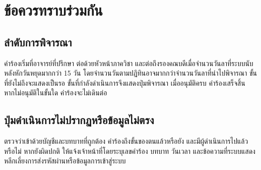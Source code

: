 \documentclass[17pt,a4paper]{extreport}
\begin{document}
\chapter{ข้อควรทราบร่วมกัน}
\section{ลำดับการพิจารณา}
คำร้องเริ่มที่อาจารย์ที่ปรึกษา ต่อด้วยหัวหน้าภาควิชา และต่อถึงรองคณบดีเมื่อจำนวนวันลาที่ระบบนับหลังหักวันหยุดมากกว่า 15 วัน โดยจำนวนวันตามปฏิทินอาจมากกว่าจำนวนวันลาที่นำไปพิจารณา ขั้นที่ยังไม่ถึงจะแสดงเป็นรอ ขั้นที่กำลังดำเนินการจึงแสดงปุ่มพิจารณา เมื่ออนุมัติครบ คำร้องเสร็จสิ้น หากไม่อนุมัติในขั้นใด คำร้องจะไม่เดินต่อ

\section{ปุ่มดำเนินการไม่ปรากฏหรือข้อมูลไม่ตรง}
ตรวจว่าเข้าด้วยบัญชีและบทบาทที่ถูกต้อง คำร้องถึงขั้นของตนแล้วหรือยัง และมีผู้ดำเนินการไปแล้วหรือไม่ หากยังผิดปกติ ให้แจ้งเจ้าหน้าที่โดยระบุเลขคำร้อง บทบาท วันเวลา และข้อความที่ระบบแสดง หลีกเลี่ยงการส่งรหัสผ่านหรือข้อมูลการเข้าสู่ระบบ
\end{document}
